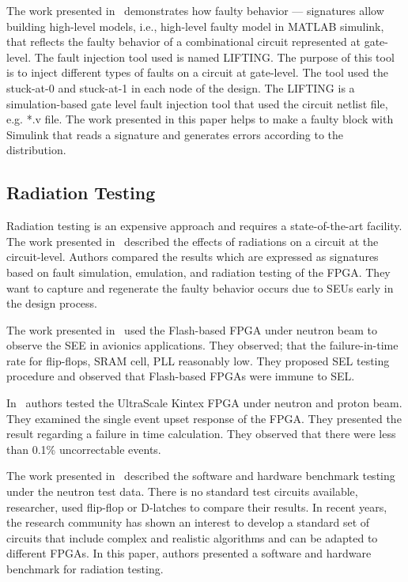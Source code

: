 The work presented in~\citep{robache2013methodology} demonstrates how faulty behavior --- signatures allow building high-level models, i.e., high-level faulty model in MATLAB simulink, that reflects the faulty behavior of a combinational circuit represented at gate-level. The fault injection tool used is named  LIFTING.  The purpose of this tool is to inject different types of faults on a circuit at gate-level. The tool used the stuck-at-0 and stuck-at-1 in each node of the design. The LIFTING is a simulation-based gate level fault injection tool that used the circuit netlist file, e.g.  *.v file. The work presented in this paper helps to make a faulty block with Simulink that reads a signature and generates errors according to the distribution.

\subsection{Radiation Testing}
Radiation testing is an expensive approach and requires a state-of-the-art facility. The work presented in~\cite{hobeika2014multi} described the effects of radiations on a circuit at the circuit-level. Authors compared the results which are expressed as signatures based on fault simulation, emulation, and radiation testing of the FPGA. They want to capture and regenerate the faulty behavior occurs due to SEUs early in the design process. 

The work presented in~\citep{dsilva2015neutron} used the Flash-based FPGA under neutron beam to observe the SEE in avionics applications. They observed;  that the failure-in-time rate for flip-flops, SRAM cell, PLL reasonably low. They proposed SEL testing procedure and observed that Flash-based FPGAs were immune to SEL. 

In~\citep{maillard2015neutron} authors tested the UltraScale Kintex FPGA under neutron and proton beam. They examined the single event upset response of the FPGA. They presented the result regarding a failure in time calculation. They observed that there were less than 0.1\% uncorrectable events. 




The work presented in~\citep{quinn2015using} described the software and hardware benchmark testing under the neutron test data. There is no standard test circuits available, researcher, used flip-flop or D-latches to compare their results. In recent years,  the research community has shown an interest to develop a standard set of circuits that include complex and realistic algorithms and can be adapted to different FPGAs. In this paper, authors presented a software and hardware benchmark for radiation testing. 


